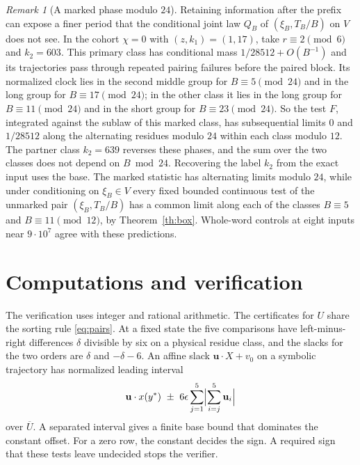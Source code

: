 \documentclass[11pt,reqno]{amsart}
\theoremstyle{remark}
\newtheorem{remark}{Remark}
\begin{document}
\begin{remark}[A marked phase modulo \(24\)]\label{rem:marked}
Retaining information after the prefix can expose a finer period that the conditional joint law \(Q_B\) of \((\xi_B,T_B/B)\) on \(V\) does not see. In the cohort \(\chi=0\) with \((z,k_1)=(1,17)\), take \(r\equiv2\pmod 6\) and \(k_2=603\). This primary class has conditional mass \(1/28512+O(B^{-1})\) and its trajectories pass through repeated pairing failures before the paired block. Its normalized clock lies in the second middle group for \(B\equiv5\pmod{24}\) and in the long group for \(B\equiv17\pmod{24}\); in the other class it lies in the long group for \(B\equiv11\pmod{24}\) and in the short group for \(B\equiv23\pmod{24}\). So the test \(F\), integrated against the sublaw of this marked class, has subsequential limits \(0\) and \(1/28512\) along the alternating residues modulo \(24\) within each class modulo \(12\). The partner class \(k_2=639\) reverses these phases, and the sum over the two classes does not depend on \(B\bmod24\). Recovering the label \(k_2\) from the exact input uses the base. The marked statistic has alternating limits modulo \(24\), while under conditioning on \(\xi_B\in V\) every fixed bounded continuous test of the unmarked pair \((\xi_B,T_B/B)\) has a common limit along each of the classes \(B\equiv5\) and \(B\equiv11\pmod{12}\), by Theorem~\ref{th:box}. Whole-word controls at eight inputs near \(9\cdot10^7\) agree with these predictions.
\end{remark}

\section{Computations and verification}\label{sec:computation}

The verification uses integer and rational arithmetic. The certificates for \(U\) share the sorting rule \eqref{eq:pairs}. At a fixed state the five comparisons have left-minus-right differences \(\delta\) divisible by six on a physical residue class, and the slacks for the two orders are \(\delta\) and \(-\delta-6\). An affine slack \(\mathbf u\cdot X+v_0\) on a symbolic trajectory has normalized leading interval
\begin{equation}\label{eq:interval}
 \mathbf u\cdot x(y^*)\ \pm\ 6\epsilon\sum_{j=1}^5\Bigl|\sum_{i=j}^5\mathbf u_i\Bigr|
\end{equation}
over \(\overline U\). A separated interval gives a finite base bound that dominates the constant offset. For a zero row, the constant decides the sign. A required sign that these tests leave undecided stops the verifier.
\end{document}

